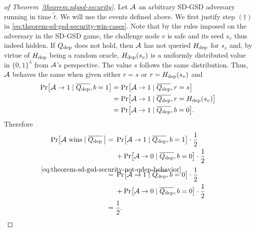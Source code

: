 \begin{proof}[of Theorem~\ref{theorem:sdgsd-security}]
	Let $\mathcal{A}$ an arbitrary SD-GSD adversary running in time $\tilde{t}$. We will use the events defined above. We first justify step $(\dagger)$ in \eqref{eq:theorem-sd-gsd-security-win-cases}. Note that by the rules imposed on the adversary in the SD-GSD game, the challenge node $v$ is safe and its seed $s_v$ thus indeed hidden. If $Q_\mathrm{dep}$ does not hold, then $\mathcal{A}$ has not queried $H_\mathrm{dep}$ for $s_v$ and, by virtue of $H_\mathrm{dep}$ being a random oracle, $H_\mathrm{dep}(s_v)$ is a uniformly distributed value in $\{0, 1\}^\lambda$ from $\mathcal{A}$'s perspective. The value $s$ follows the same distribution. Thus, $\mathcal{A}$ behaves the same when given either $r = s$ or $r = H_\mathrm{dep}(s_v)$ and
	\begin{align} \label{eq:theorem-sd-gsd-security-not-qdep-behavior}
		\begin{split}
			\pr{\adv \rightarrow 1 \mid \overline{\qdep}, b = 1} & = \pr{\adv \rightarrow 1 \mid \overline{\qdep}, r = s}          \\
			& = \pr{\adv \rightarrow 1 \mid \overline{\qdep}, r = \hdep(s_v)} \\
			& = \pr{\adv \rightarrow 1 \mid \overline{\qdep}, b = 0}.
		\end{split}
	\end{align}
	Therefore
	\begin{align*}
		\pr{\wins \mid \overline{\qdep} \,} & = \begin{aligned}[t]
			                                         & \pr{\adv \rightarrow 1 \mid \overline{\qdep}, b = 1} \cdot \frac{1}{2}   \\
			                                         & + \pr{\adv \rightarrow 0 \mid \overline{\qdep}, b = 0} \cdot \frac{1}{2}
		                                        \end{aligned}                                                                             \\
		                                    & \stackrel{\mathclap{\eqref{eq:theorem-sd-gsd-security-not-qdep-behavior}}}{=} \begin{aligned}[t]
			                                                                                                                     & \pr{\adv \rightarrow 1 \mid \overline{\qdep}, b = 0} \cdot \frac{1}{2}   \\
			                                                                                                                     & + \pr{\adv \rightarrow 0 \mid \overline{\qdep}, b = 0} \cdot \frac{1}{2}
		                                                                                                                    \end{aligned} \\
		                                    & = \frac{1}{2}.
	\end{align*}


\end{proof}
